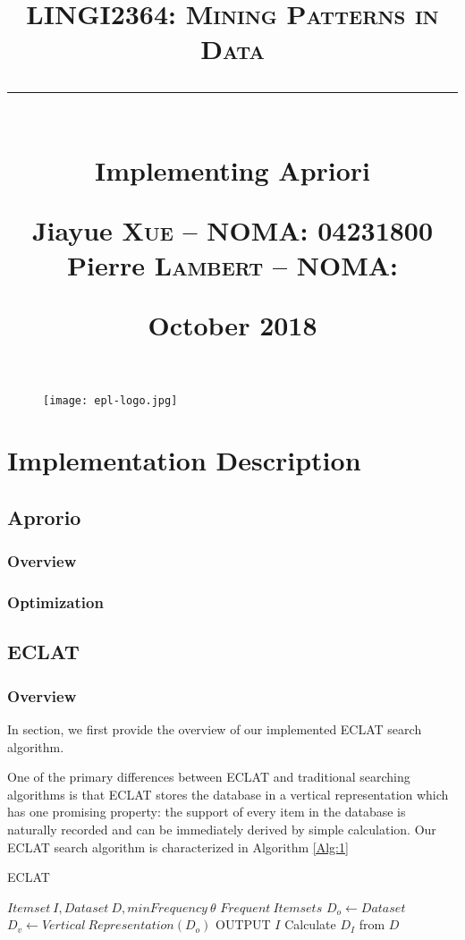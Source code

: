 \documentclass[12pt, a4paper]{report}
\title{
	\vspace{0.5cm} \textcolor{db}{\textsc{LINGI2364: Mining Patterns in Data}} \\
	\vspace{0.5 cm} \rule{10 cm}{0.5pt} \\
	\vspace{0.5 cm} \Large{Implementing Apriori} \\
	\vspace{5 cm}
	\begin{flushright}
		\large
		Jiayue \textsc{Xue} -- NOMA: 04231800 \\
		Pierre \textsc{Lambert} -- NOMA: \\     
	\end{flushright}
	\vspace{0.5 cm}
	\begin{flushright}
		\normalsize \nth{21} October 2018 \\
	\end{flushright}
}
\author{}
\date{}
\begin{document}
\begin{figure}[t]
	\hspace{10 cm} \texttt{[image: epl-logo.jpg]}
\end{figure}

\maketitle

\tableofcontents


\chapter{Implementation Description}

\section{Aprorio}

\subsection{Overview}

\subsection{Optimization}


\section{ECLAT}

\subsection{Overview}
In section, we first provide the overview of our implemented ECLAT search algorithm. 

One of the primary differences between ECLAT and traditional searching algorithms is that ECLAT stores the database in a vertical representation which has one promising property: the support of every item in the database is naturally recorded and can be immediately derived by simple calculation.
Our ECLAT search algorithm is characterized in Algorithm \ref{Alg:1}

\begin{algorithm}
	\caption{ECLAT}
	\label{Alg:1}
	\begin{algorithmic}
		\Require $Itemset~I, Dataset~D, minFrequency~\theta$
		\Ensure $Frequent~Itemsets$
		\State
		\State $D_o \gets Dataset$
		\State $D_v \gets Vertical~Representation(D_o)$
		\State {}
		\State
				\State OUTPUT $I$
				\State Calculate $D_{I}$ from $D$
					\State {}

				\EndFor
			\EndIf
		\EndFunction
	   


	\end{algorithmic}
\end{algorithm}
\end{document}

